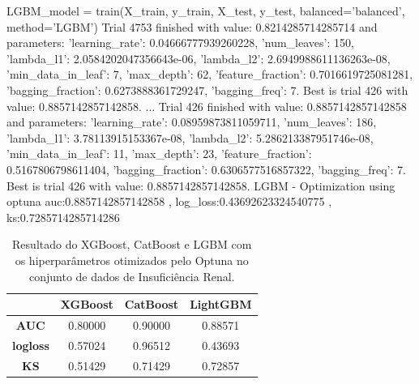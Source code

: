 \begin{codigo}[caption={Resultado do Optuna no conjunto de dados de Insuficiência Renal.}, label={codigo:res:op:ren}, language=Python, breaklines=true]
LGBM_model = train(X_train, y_train, X_test, y_test, balanced='balanced', method='LGBM')
Trial 4753 finished with value: 0.8214285714285714 and parameters: {'learning_rate': 0.04666777939260228, 'num_leaves': 150, 'lambda_l1': 2.0584202047356643e-06, 'lambda_l2': 2.6949988611136263e-08, 'min_data_in_leaf': 7, 'max_depth': 62, 'feature_fraction': 0.7016619725081281, 'bagging_fraction': 0.6273888361729247, 'bagging_freq': 7}. Best is trial 426 with value: 0.8857142857142858.
...
Trial 426 finished with value: 0.8857142857142858 and parameters: {'learning_rate': 0.08959873811059711, 'num_leaves': 186, 'lambda_l1': 3.78113915153367e-08, 'lambda_l2': 5.286213387951746e-08, 'min_data_in_leaf': 11, 'max_depth': 23, 'feature_fraction': 0.5167806798611404, 'bagging_fraction': 0.6306577516857322, 'bagging_freq': 7}. Best is trial 426 with value: 0.8857142857142858.
LGBM - Optimization using optuna
auc:0.8857142857142858 , log_loss:0.43692623324540775 , ks:0.7285714285714286
\end{codigo}

\begin{table}[H]
\centering
\begin{tabular}{|c|c|c|c|}
\hline
	& \textbf{XGBoost} &\textbf{CatBoost} & \textbf{LightGBM} \\
\hline
\textbf{AUC}	& 0.80000	&0.90000&	0.88571 \\
\hline
\textbf{logloss}	& 0.57024	& 0.96512 &	0.43693\\
\hline
\textbf{KS}	&0.51429&	0.71429	& 0.72857\\
\hline
\end{tabular}
\caption{Resultado do XGBoost, CatBoost e LGBM com os hiperparâmetros otimizados pelo Optuna no conjunto de dados de Insuficiência Renal.}\label{res:ren:op}
\end{table}
